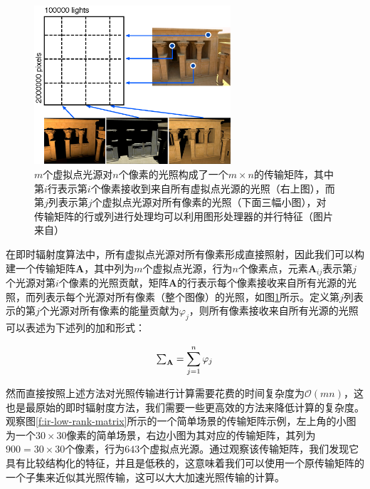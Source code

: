 \begin{figure}
	\sidecaption
	\includegraphics[width=0.65\textwidth]{figures/ir/matrix-interpretation}
	\caption{$m$个虚拟点光源对$n$个像素的光照构成了一个$m\times n$的传输矩阵，其中第$i$行表示第$i$个像素接收到来自所有虚拟点光源的光照（右上图），而第$j$列表示第$j$个虚拟点光源对所有像素的光照（下面三幅小图），对传输矩阵的行或列进行处理均可以利用图形处理器的并行特征（图片来自\cite{a:MatrixRow-ColumnSamplingfortheMany-LightProblem}）}
	\label{f:ir-matrix-interpretation}
\end{figure}

在即时辐射度算法中，所有虚拟点光源对所有像素形成直接照射，因此我们可以构建一个传输矩阵$\mathbf{A}$，其中列为$m$个虚拟点光源，行为$n$个像素点，元素$\mathbf{A}_{ij}$表示第$j$个光源对第$i$个像素的光照贡献，矩阵$\mathbf{A}$的行表示每个像素接收来自所有光源的光照，而列表示每个光源对所有像素（整个图像）的光照，如图\ref{f:ir-matrix-interpretation}所示。定义第$j$列表示的第$j$个光源对所有像素的能量贡献为$\varphi_j$，则所有像素接收来自所有光源的光照可以表述为下述列的加和形式：

\begin{equation}\label{e:ir-column-sum-estimate}
	\mathsmaller\sum\nolimits_{\mathbf{A}}= \sum^{n}_{j=1}\varphi_j
\end{equation}

\noindent 然而直接按照上述方法对光照传输进行计算需要花费的时间复杂度为$\mathcal{O}(mn)$，这也是最原始的即时辐射度方法，我们需要一些更高效的方法来降低计算的复杂度。观察图\ref{f:ir-low-rank-matrix}所示的一个简单场景的传输矩阵示例，左上角的小图为一个$30\times 30$像素的简单场景，右边小图为其对应的传输矩阵，其列为$900=30\times 30$个像素，行为$643$个虚拟点光源。通过观察该传输矩阵，我们发现它具有比较结构化的特征，并且是低秩的，这意味着我们可以使用一个原传输矩阵的一个子集来近似其光照传输，这可以大大加速光照传输的计算。

